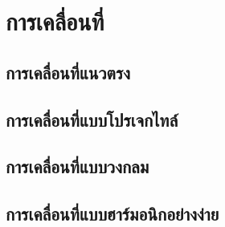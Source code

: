 \documentclass[a4paper,12pt]{report}
\begin{document}
\chapter{การเคลื่อนที่}
\section{การเคลื่อนที่แนวตรง}
\begin{c2}\end{c2}



\begin{c2}\end{c2}





\begin{c2}\end{c2}


\begin{c2}\end{c2}


\begin{c2}\end{c2}

\begin{c2}\end{c2}


\begin{c2}\end{c2}


\section{การเคลื่อนที่แบบโปรเจกไทล์}
\begin{c2}\end{c2}

\begin{c2}\end{c2}

\section{การเคลื่อนที่แบบวงกลม}
\begin{c2}\end{c2}

\begin{c2}\end{c2}

\begin{c2}\end{c2}

\section{การเคลื่อนที่แบบฮาร์มอนิกอย่างง่าย}
\begin{c2}\end{c2}

\begin{c2}\end{c2}

\end{document}
